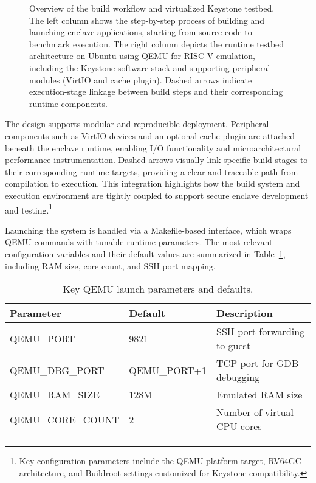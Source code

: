 \begin{figure}[htbp]
\caption{Overview of the build workflow and virtualized Keystone testbed. The left column shows the step-by-step process of building and launching enclave applications, starting from source code to benchmark execution. The right column depicts the runtime testbed architecture on Ubuntu using QEMU for RISC-V emulation, including the Keystone software stack and supporting peripheral modules (VirtIO and cache plugin). Dashed arrows indicate execution-stage linkage between build steps and their corresponding runtime components.}
\label{fig:integrated_two_column_peripherals_below}
\end{figure}

The design supports modular and reproducible deployment. Peripheral components such as VirtIO devices and an optional cache plugin are attached beneath the enclave runtime, enabling I/O functionality and microarchitectural performance instrumentation. Dashed arrows visually link specific build stages to their corresponding runtime targets, providing a clear and traceable path from compilation to execution. This integration highlights how the build system and execution environment are tightly coupled to support secure enclave development and testing.\footnote{Key configuration parameters include the QEMU platform target, RV64GC architecture, and Buildroot settings customized for Keystone compatibility.}

Launching the system is handled via a Makefile-based interface, which wraps QEMU commands with tunable runtime parameters. The most relevant configuration variables and their default values are summarized in Table~\ref{tab:qemu-params}, including RAM size, core count, and SSH port mapping.
\begin{table}[h]
\centering
\caption{Key QEMU launch parameters and defaults.}
\label{tab:qemu-params}
\begin{tabular}{l l p{6cm}}
\toprule
\textbf{Parameter} & \textbf{Default} & \textbf{Description} \\
\midrule
QEMU\_PORT & 9821 & SSH port forwarding to guest \\
QEMU\_DBG\_PORT & QEMU\_PORT+1 & TCP port for GDB debugging \\
QEMU\_RAM\_SIZE & 128M & Emulated RAM size \\
QEMU\_CORE\_COUNT & 2 & Number of virtual CPU cores \\
\bottomrule
\end{tabular}
\end{table}

